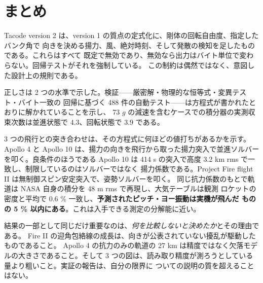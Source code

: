 \documentclass[11pt,a4paper,dvipdfmx]{jsarticle}
\begin{document}
\section{まとめ}

Tacode version 2 は、version 1 の質点の定式化に、剛体の回転自由度、指定したバンク角で
向きを決める揚力、風、絶対時刻、そして発散の検知を足したものである。これらはすべて
既定で無効であり、無効なら出力はバイト単位で変わらない。回帰テストがそれを強制している。
この制約は偶然ではなく、意図した設計上の規則である。

正しさは 2 つの水準で示した。検証——厳密解・物理的な恒等式・変異テスト・バイト一致の
回帰に基づく 488 件の自動テスト——は方程式が書かれたとおりに解かれていることを示し、
73 $g$ の減速を含むケースでの積分器の実測収束次数は並進状態で 4.3、回転状態で 3.9 である。

3 つの飛行との突き合わせは、その方程式に何ほどの値打ちがあるかを示す。Apollo 4 と
Apollo 10 は、揚力の向きを飛行から取った揚力突入で並進ソルバーを叩く。良条件のほうである
Apollo 10 は 414 s の突入で高度 3.2 km rms で一致し、制限しているのはソルバーではなく
揚力係数である。Project Fire flight II は無制御スピン安定突入で、姿勢ソルバーを叩く。
同じ抗力係数のもとで軌道は NASA 自身の積分を 48 m rms で再現し、大気テーブルは観測
ロケットの密度と平均で 0.6 \% 一致し、\textbf{予測されたピッチ・ヨー振動は実機が飛んだ
ものの 5 \% 以内にある}。これは入手できる測定の分解能に近い。

結果の一部として同じだけ重要なのは、\emph{何を比較しないと決めたか}とその理由である。
Fire II の迎角包絡線の成長は、向きが公表されていない擾乱が駆動したものであること。
Apollo 4 の抗力のみの軌道の 27 km は精度ではなく欠落モデルの大きさであること。そして
3 つの図は、読み取り精度が測ろうとしている量より粗いこと。実証の報告は、自分の限界に
ついての説明の質を超えることはない。
\end{document}
